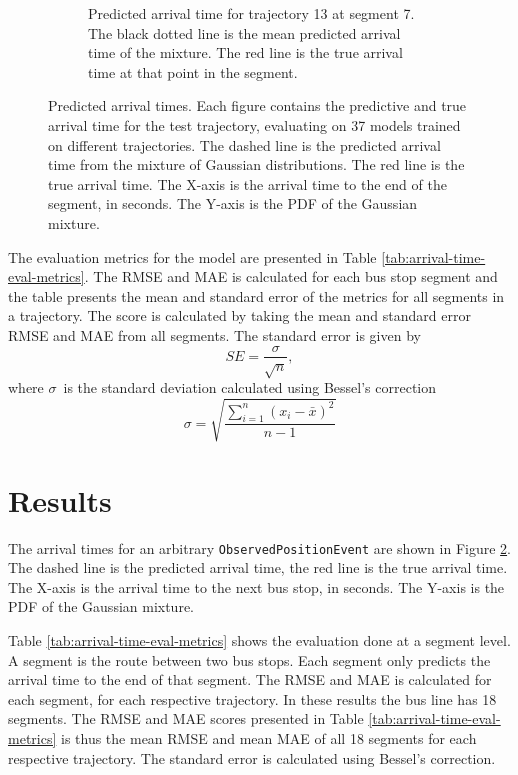 \begin{figure}
\begin{subfigure}[b]{0.475\textwidth}
        \caption[]%
        {{\small Predicted arrival time for trajectory 13 at segment 7.
        The black dotted line is the mean predicted arrival time of the mixture.
        The red line is the true arrival time at that point in the segment.}}    
        \label{fig:result-4}
    \end{subfigure}
    \caption[ Predicted arrival times ]
    {{\small Predicted arrival times.
    Each figure contains the predictive and true arrival time for the test trajectory, evaluating on 37 models trained on different trajectories.
    The dashed line is the predicted arrival time from the mixture of Gaussian distributions.
    The red line is the true arrival time.
    The X-axis is the arrival time to the end of the segment, in seconds.
    The Y-axis is the PDF of the Gaussian mixture. }} 
    \label{fig:arrival-times}
\end{figure}

The evaluation metrics for the model are presented in Table \ref{tab:arrival-time-eval-metrics}.
The RMSE and MAE is calculated for each bus stop segment and the table presents the mean and standard error of the metrics for all segments in a trajectory.
The score is calculated by taking the mean and standard error RMSE and MAE from all segments.
The standard error is given by 
\begin{equation}
    SE = \frac{\sigma}{\sqrt{n}},
\end{equation}
where $\sigma$ is the standard deviation calculated using Bessel's correction
\begin{equation}
    \sigma = \sqrt{\frac{\sum_{i=1}^n (x_i - \bar{x})^2}{n - 1}}
\end{equation}

\section{Results}
The arrival times for an arbitrary \texttt{ObservedPositionEvent} are shown in Figure \ref{fig:arrival-times}.
The dashed line is the predicted arrival time, the red line is the true arrival time.
The X-axis is the arrival time to the next bus stop, in seconds.
The Y-axis is the PDF of the Gaussian mixture.

Table \ref{tab:arrival-time-eval-metrics} shows the evaluation done at a segment level.
A segment is the route between two bus stops.
Each segment only predicts the arrival time to the end of that segment.
The RMSE and MAE is calculated for each segment, for each respective trajectory.
In these results the bus line has 18 segments.
The RMSE and MAE scores presented in Table \ref{tab:arrival-time-eval-metrics} is thus the mean RMSE and mean MAE of all 18 segments for each respective trajectory.
The standard error is calculated using Bessel's correction.

